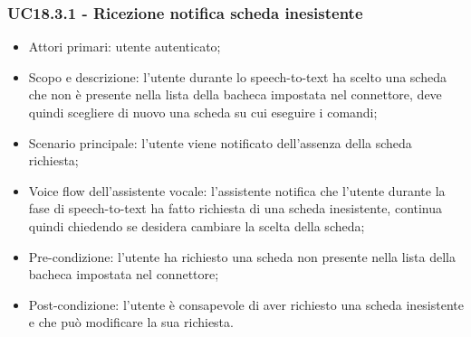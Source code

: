 \subsubsection{UC18.3.1 - Ricezione notifica scheda inesistente}
\begin{itemize}
	\item  Attori primari: utente autenticato;
	\item  Scopo e descrizione: l'utente durante lo speech-to-text ha scelto una scheda che non è presente nella lista della bacheca impostata nel connettore, deve quindi scegliere di nuovo una scheda su cui eseguire i comandi;
	\item  Scenario principale: l'utente viene notificato dell'assenza della scheda richiesta;
	\item  Voice flow dell'assistente vocale: l'assistente notifica che l'utente durante la fase di speech-to-text ha fatto richiesta di una scheda inesistente, continua quindi chiedendo se desidera cambiare la scelta della scheda;
	\item  Pre-condizione: l'utente ha richiesto una scheda non presente nella lista della bacheca impostata nel connettore;
	\item  Post-condizione: l'utente è consapevole di aver richiesto una scheda inesistente e che può modificare la sua richiesta.
\end{itemize}
